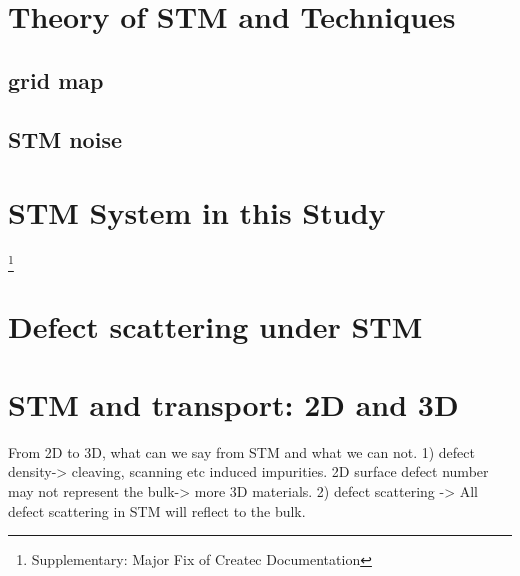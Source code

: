 \section{Theory of STM and Techniques}
\subsection{grid map}
\subsection{STM noise}
\section{STM System in this Study}
\footnote{Supplementary: Major Fix of Createc Documentation}
\section{Defect scattering under STM}

\section{STM and transport: 2D and 3D}
From 2D to 3D, what can we say from STM and what we can not. 
1) defect density-> cleaving, scanning etc induced impurities. 2D surface defect number may not represent the bulk-> more 3D materials. 
2) defect scattering -> All defect scattering in STM will reflect to the bulk. 
